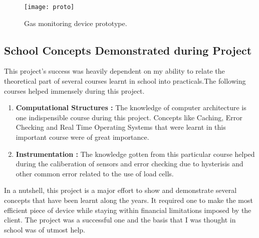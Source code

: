 \begin{figure}
    \centering
    \texttt{[image: proto]}
	\caption{Gas monitoring device prototype.}
    \label{fig:gas_scale_iot_pix}
\end{figure}


\subsection{School Concepts Demonstrated during Project}
This project's success was heavily dependent on my ability to relate the theoretical part of several courses learnt in school into practicals.The following courses helped immensely during this project.
\begin{enumerate}
\item \textbf{Computational Structures :} The knowledge of computer architecture is one indispensible course during this project. Concepts like Caching, Error Checking and Real Time Operating Systems that were learnt in this important course were of great importance.
\item \textbf{Instrumentation :} The knowledge gotten from this particular course helped during the caliberation of sensors and error checking due to hysterisis and other common error related to the use of load cells. 
\end{enumerate}
In a nutshell, this project is a major effort to show and demonstrate several concepts that have been learnt along the years. It required one to make the most efficient piece of device while staying within financial limitations imposed by the client. The project was a successful one and the basis that I was thought in school was of utmost help.





